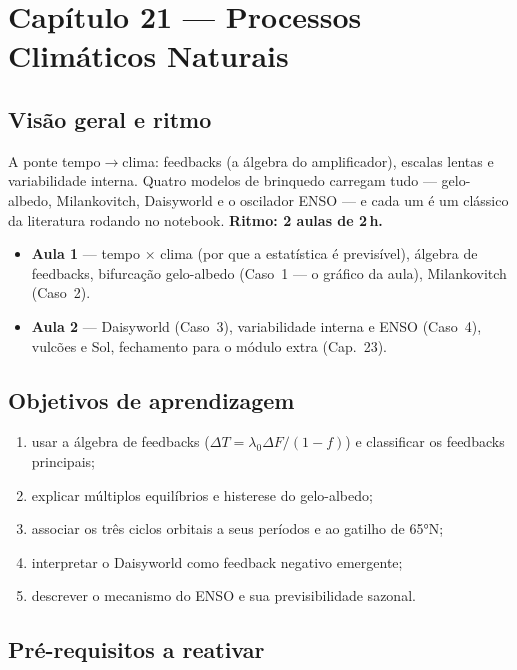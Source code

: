 ﻿%
\section{Capítulo 21 --- Processos Climáticos Naturais}

\subsection*{Visão geral e ritmo}

A ponte tempo$\to$clima: feedbacks (a álgebra do amplificador),
escalas lentas e variabilidade interna. Quatro modelos de brinquedo
carregam tudo — gelo-albedo, Milankovitch, Daisyworld e o oscilador
ENSO — e cada um é um clássico da literatura rodando no notebook.
\textbf{Ritmo: 2 aulas de 2\,h.}

\begin{itemize}
  \item \textbf{Aula 1} — tempo × clima (por que a estatística é
        previsível), álgebra de feedbacks, bifurcação gelo-albedo
        (Caso~1 — o gráfico da aula), Milankovitch (Caso~2).
  \item \textbf{Aula 2} — Daisyworld (Caso~3), variabilidade interna
        e ENSO (Caso~4), vulcões e Sol, fechamento para o módulo extra (Cap.~23).
\end{itemize}

\subsection*{Objetivos de aprendizagem}

\begin{enumerate}
  \item usar a álgebra de feedbacks ($\Delta T =
        \lambda_0\Delta F/(1-f)$) e classificar os feedbacks
        principais;
  \item explicar múltiplos equilíbrios e histerese do gelo-albedo;
  \item associar os três ciclos orbitais a seus períodos e ao gatilho
        de 65°N;
  \item interpretar o Daisyworld como feedback negativo emergente;
  \item descrever o mecanismo do ENSO e sua previsibilidade sazonal.
\end{enumerate}

\subsection*{Pré-requisitos a reativar}


